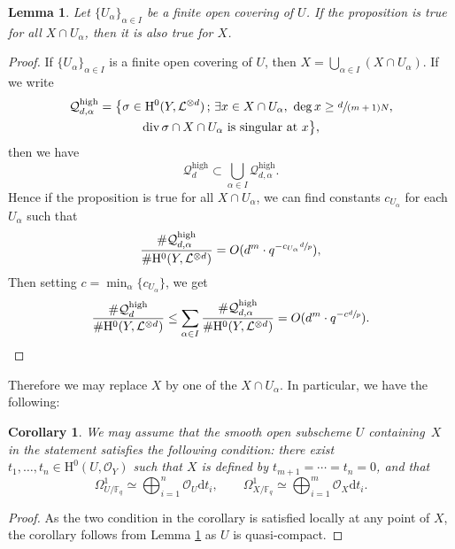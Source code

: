 \documentclass[11pt]{article}
\numberwithin{equation}{section}
\newcommand{\sep}{\,;\,}
\theoremstyle{plain}
\newtheorem{cor}[thm]{Corollary}
\newtheorem{lem}[thm]{Lemma}
\theoremstyle{definition}
\newcommand{\ho}{\mathrm{H}}
\newcommand{\Oc}{\mathcal{O}}
\newcommand{\li}{\mathcal{L}}
\newcommand{\F}{\mathbb{F}}
\begin{document}
\begin{lem}\label{cover}
Let $\{ U_{\alpha} \}_{\alpha\in I}$ be a finite open covering of $U$. If the proposition is true for all $X\cap U_{\alpha}$, then it is also true for $X$.
\end{lem}
\begin{proof}
If $\{ U_{\alpha} \}_{\alpha\in I}$ is a finite open covering of $U$, then $X=\bigcup_{\alpha\in I} (X\cap U_{\alpha})$. If we write\vspace*{-3pt}
\begin{multline*}
\mathcal{Q}_{d,\alpha}^{\mathrm{high}}= \bigl\{ \sigma\in \ho^0(Y,\li^{\otimes d})\sep \exists x\in X\cap U_{\alpha},\ \deg x\geq \sfrac{d}{(m+1)N},\\ \div \sigma\cap X\cap U_{\alpha} \text{ is singular at }x \bigr\},
\end{multline*}
then we have\vspace*{-3pt}
\[
\mathcal{Q}_{d}^{\mathrm{high}}\subset \bigcup_{\alpha\in I}\mathcal{Q}_{d,\alpha}^{\mathrm{high}}.
\]
Hence if the proposition is true for all $X\cap U_{\alpha}$, we can find constants $c_{U_{\alpha}}$ for each $U_{\alpha}$ such that\vspace*{-3pt}
\[
\frac{ \#\mathcal{Q}_{d,\alpha}^{\mathrm{high}}}{\# \ho^0(Y, \mathcal{L}^{\otimes d})}=O(d^{m}\cdot q^{-c_{U_{\alpha}}\sfrac{d}{p}}),
\]
Then setting $c=\min_{\alpha}\{ c_{U_{\alpha}} \}$, we get\vspace*{-3pt}
\[
\frac{ \#\mathcal{Q}_d^{\mathrm{high}}}{\# \ho^0(Y, \mathcal{L}^{\otimes d})}\leq \sum_{\alpha\in I} \frac{ \#\mathcal{Q}_{d,\alpha}^{\mathrm{high}}}{\# \ho^0(Y, \mathcal{L}^{\otimes d})}=O(d^{m}\cdot q^{-c\sfrac{d}{p}}).\qedhere
\]
\end{proof}
Therefore we may replace $X$ by one of the $X\cap U_{\alpha}$. In particular, we have the following:
\begin{cor}\label{trivi}
We may assume that the smooth open subscheme $U$ containing~$X$ in the statement satisfies the following condition: there exist $t_1, \dots, t_n\in \ho^0(U, \mathcal{O}_Y)$ such that $X$ is defined by $t_{m+1}=\cdots=t_n=0$, and that\vspace*{-3pt}
\[
\Omega_{U/\F_q}^1\simeq \bigoplus_{i=1}^n\Oc_U \mathrm{d} t_i,\qquad \Omega_{X/\F_q}^1\simeq \bigoplus_{i=1}^m\Oc_X\mathrm{d}t_i.
\]
\end{cor}
\begin{proof}[Proof]
As the two condition in the corollary is satisfied locally at any point of $X$, the corollary follows from Lemma \ref{cover} as $U$ is quasi-compact.
\end{proof}
\end{document}
